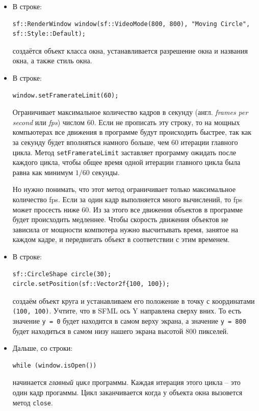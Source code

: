 \documentclass{article}
\begin{document}
\begin{itemize}
\item В строке:
\begin{lstlisting}[frame=none]
sf::RenderWindow window(sf::VideoMode(800, 800), "Moving Circle", sf::Style::Default);
\end{lstlisting}
создаётся объект класса окна, устанавливается разрешение окна и названия окна, а также стиль окна.
\item В строке:
\begin{lstlisting}[frame=none]
window.setFramerateLimit(60);
\end{lstlisting}
Ограничивает максимальное количество кадров в секунду (англ. \textit{frames per second} или \textit{fps}) числом 60. Если не прописать эту строку, то на мощных компьютерах все движения в программе будут происходить быстрее, так как за секунду будет вполняться намного больше, чем 60 итерации главного цикла. Метод \texttt{setFramerateLimit} заставляет программу ожидать после каждого цикла, чтобы общее время одной итерации главного цикла была равна как минимум $1/60$ секунды.

Но нужно понимать, что этот метод ограничивает только максимальное количество fps. Если за один кадр выполняется много вычислений, то fps может просесть ниже 60. Из за этого все движения объектов в программе будет происходить медленнее. Чтобы скорость движения объектов не зависила от мощности компютера нужно высчитывать время, занятое на каждом кадре, и передвигать объект в соответствии с этим временем.


\item В строке:
\begin{lstlisting}[frame=none]
sf::CircleShape circle(30);
circle.setPosition(sf::Vector2f{100, 100});
\end{lstlisting}
создаём объект круга и устанавливаем его положение в точку с координатами \texttt{(100, 100)}. Учтите, что в SFML ось Y направлена сверху вних. То есть значение \texttt{y = 0} будет находится в самом верху экрана, а значение \texttt{y = 800} будет находиться в самом низу нашего экрана высотой 800 пикселей.


\item Дальше, со строки:
\begin{lstlisting}[frame=none]
while (window.isOpen())
\end{lstlisting}
начинается  \textit{главный цикл} программы. Каждая итерация этого цикла -- это один кадр прогаммы. Цикл заканчивается когда у объекта окна вызовется метод \texttt{close}.


\end{itemize}
\end{document}
